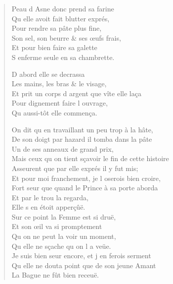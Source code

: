 \documentclass[14pt,a4paper]{memoir}
\begin{document}
{{\begin{otherlanguage}{french}
\begin{verse}
\vin Peau d\textquotesingle{} Asne donc prend sa farine \\
\vin Qu\textquotesingle{} elle avoit fait blutter exprés, \\
\vin Pour rendre sa pâte plus fine, \\
\vin Son sel, son beurre \& ses œufs frais, \\
\vin Et pour bien faire sa galette \\
\vin S\textquotesingle{} enferme seule en sa chambrette.

\vin D\textquotesingle{} abord elle se decrassa \\
\vin Les mains, les bras \& le visage, \\
Et prit un corps d\textquotesingle{} argent que vîte elle laça \\
\vin Pour dignement faire l\textquotesingle{} ouvrage, \\
\vin Qu\textquotesingle{} aussi-tôt elle commença.

On dit qu\textquotesingle{} en travaillant un peu trop à la hâte, \\
De son doigt par hazard il tomba dans la pâte \\
\vin Un de ses anneaux de grand prix, \\
Mais ceux qu\textquotesingle{} on tient sçavoir le fin de cette histoire \\
Asseurent que par elle exprés il y fut mis; \\
Et pour moi franchement, je l\textquotesingle{} oserois bien croire, \\
Fort seur que quand le Prince à sa porte aborda \\
\vin Et par le trou la regarda, \\
\vin\vin Elle s\textquotesingle{} en étoit apperçûë. \\
\vin Sur ce point la Femme est si druë, \\
\vin Et son œil va si promptement \\
\vin Qu\textquotesingle{} on ne peut la voir un moment, \\
\vin Qu\textquotesingle{} elle ne sçache qu\textquotesingle{} on l\textquotesingle{} a veüe. \\
Je suis bien seur encore, et j\textquotesingle{} en ferois serment \\
Qu\textquotesingle{} elle ne douta point que de son jeune Amant \\
\vin La Bague ne fût bien receuë.


\end{verse}
\end{otherlanguage}}}
\end{document}
